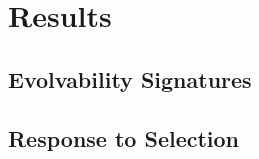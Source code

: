 \section{Results} \label{sec:results}


\subsection{Evolvability Signatures}

\subsection{Response to Selection}
